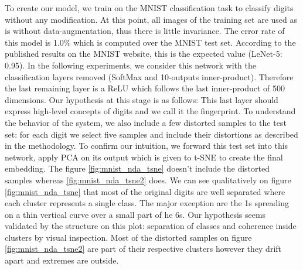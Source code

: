 \documentclass[a4paper,12pt]{report}
\begin{document}
To create our model, we train on the MNIST classification task to classify digits without any modification.
At this point, all images of the training set are used as is without data-augmentation, thus there is little invariance.
The error rate of this model is 1.0\% which is computed over the MNIST test set.
According to the published results on the MNIST website, this is the expected value (LeNet-5: 0.95)\cite{mnist_web}.
In the following experiments, we consider this network with the classification layers removed (SoftMax and 10-outputs inner-product).
Therefore the last remaining layer is a ReLU which follows the last inner-product of 500 dimensions.
Our hypothesis at this stage is as follows: This last layer should express high-level concepts of digits and we call it the fingerprint.
To understand the behavior of the system, we also include a few distorted samples to the test set: for each digit we select five samples and include their distortions as described in the methodology.
To confirm our intuition, we forward this test set into this network, apply PCA on its output which is given to t-SNE to create the final embedding.
The figure \ref{fig:mnist_nda_tsne} doesn't include the distorted samples whereas \ref{fig:mnist_nda_tsne2} does.
We can see qualitatively on figure \ref{fig:mnist_nda_tsne} that most of the original digits are well separated where each cluster represents a single class.
The major exception are the 1s spreading on a thin vertical curve over a small part of he 6s.
Our hypothesis seems validated by the structure on this plot: separation of classes and coherence inside clusters by visual inspection.
Most of the distorted samples on figure \ref{fig:mnist_nda_tsne2} are part of their respective clusters however they drift apart and extremes are outside.
\end{document}
